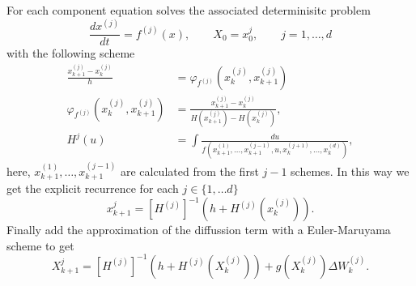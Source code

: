 \documentclass[review]{elsarticle}
\begin{document}
		For each component equation solves the associated determinisitc problem
		$$
			\frac{dx^{(j)}}{dt} = f^{(j)}(x), \qquad X_0= x_0^j, \qquad j = 1, \dots, d
		$$
		with the following scheme
		\begin{align}
			\frac{x^{(j)}_{k+1} - x^{(j)}_{k} }{h}	&= \varphi_{f^{(j)}}(x^{(j)}_{k}, x^{(j)}_{k+1})	\\
			\varphi_{f^{(j)}} \left(x^{(j)}_{k}, x^{(j)}_{k+1} \right) &= 
				\frac{x^{(j)}_{k+1} - x^{(j)}_{k} }{H(x^{(j)}_{k+1}) -H(x^{(j)}_{k})},	\\
				H^j(u) &= 
					\int 
						\frac{du}{
							f(x^{(1)}_{k+1}, \dots, x^{(j-1)}_{k+1}, u, x^{(j+1)}_{k}, \dots, x^{(d)}_{k})
						},
		\end{align}
		here, $x^{{(1)}}_{k+1}, \dots, x^{{(j-1)}}_{k+1}$ are calculated from the first
		$j-1$ schemes. In this way we get the explicit recurrence for each $j\in \{ 1,\dots d\}$
		\begin{equation}
			x_{k+1}^{j} = 
				[H^{(j)}]^{-1}
				\left(
					h + H^{(j)}\left(x_k^{(j)}\right)
				\right).
		\end{equation}
		Finally add the approximation of the diffussion term with a Euler-Maruyama scheme to get
		\begin{equation}
			X_{k+1}^{j} = 
				[H^{(j)}]^{-1}
				\left(
					h + H^{(j)}
					\left(
						X_k^{(j)}
					\right)
				\right)
			+ g \left(X_k^{(j)} \right) \Delta W_k^{(j)}.
		\end{equation}
\end{document}
